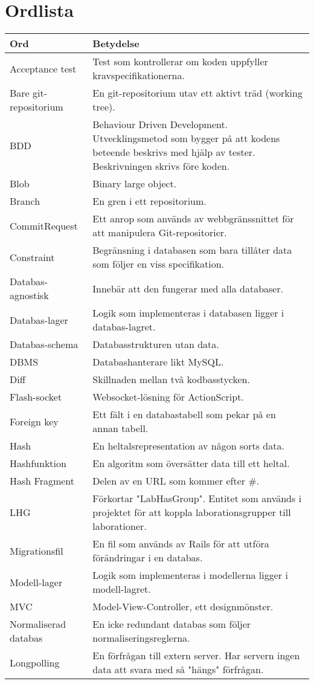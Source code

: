 \section{Ordlista}
\label{sec:ordlista}
\small
\begin{tabular} { | l | p{10cm} | }
\hline
\bf{Ord} & \bf{Betydelse} \\
\hline
Acceptance test	& Test som kontrollerar om koden uppfyller kravspecifikationerna. \\
\hline
Bare git-repositorium & En git-repositorium utav ett aktivt träd (working tree). \\
\hline
BDD & Behaviour Driven Development. Utvecklingsmetod som bygger på att kodens
beteende beskrivs med hjälp av tester. Beskrivningen skrivs före koden. \\
\hline
Blob & Binary large object.\\
\hline
Branch & En gren i ett repositorium. \\
\hline
CommitRequest & Ett anrop som används av webbgränssnittet för att manipulera Git-repositorier. \\
\hline
Constraint & Begränsning i databasen som bara tillåter data som följer en viss specifikation. \\
\hline
Databas-agnostisk & Innebär att den fungerar med alla databaser. \\
\hline
Databas-lager & Logik som implementeras i databasen ligger i databas-lagret. \\
\hline
Databas-schema & Databasstrukturen utan data. \\
\hline
DBMS & Databashanterare likt MySQL. \\
\hline
Diff & Skillnaden mellan två kodbasstycken. \\
\hline
Flash-socket & Websocket-lösning för ActionScript. \\
\hline
Foreign key & Ett fält i en databastabell som pekar på en annan tabell. \\
\hline
Hash & En heltalsrepresentation av någon sorts data. \\
\hline
Hashfunktion & En algoritm som översätter data till ett heltal. \\
\hline
Hash Fragment & Delen av en URL som kommer efter \#. \\
\hline
LHG & Förkortar "LabHasGroup". Entitet som används i projektet för att koppla laborationsgrupper till laborationer. \\
\hline
Migrationsfil & En fil som används av Rails för att utföra förändringar i en databas. \\
\hline
Modell-lager & Logik som implementeras i modellerna ligger i modell-lagret. \\
\hline
MVC & Model-View-Controller, ett designmönster. \\
\hline
Normaliserad databas & En icke redundant databas som följer normaliseringsreglerna. \\
\hline
Longpolling & En förfrågan till extern server. Har servern ingen data att svara med så "hängs" förfrågan. \\
\hline
\end{tabular}

